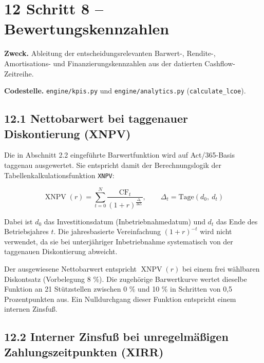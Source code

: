 \documentclass[
  a4paper,
  10pt]{article}
\begin{document}
\hypertarget{schritt-8-bewertungskennzahlen}{%
\section{12 Schritt 8 --
Bewertungskennzahlen}\label{schritt-8-bewertungskennzahlen}}

\textbf{Zweck.} Ableitung der entscheidungsrelevanten Barwert-,
Rendite-, Amortisations- und Finanzierungskennzahlen aus der datierten
Cashflow-Zeitreihe.

\textbf{Codestelle.} \nolinkurl{engine/kpis.py} und
\nolinkurl{engine/analytics.py} (\texttt{calculate\_lcoe}).

\hypertarget{nettobarwert-bei-taggenauer-diskontierung-xnpv}{%
\subsection{12.1 Nettobarwert bei taggenauer Diskontierung
(XNPV)}\label{nettobarwert-bei-taggenauer-diskontierung-xnpv}}

Die in Abschnitt 2.2 eingeführte Barwertfunktion wird auf Act/365-Basis
taggenau ausgewertet. Sie entspricht damit der Berechnungslogik der
Tabellenkalkulationsfunktion \texttt{XNPV}:

\[ \operatorname{XNPV}(r) = \sum_{t=0}^{N} \frac{\mathrm{CF}_t}{(1+r)^{\frac{\Delta_t}{365}}}, \qquad \Delta_t = \text{Tage}(d_0,\ d_t) \]

Dabei ist \(d_0\) das Investitionsdatum (Inbetriebnahmedatum) und
\(d_t\) das Ende des Betriebsjahres \(t\). Die jahresbasierte
Vereinfachung \((1+r)^{-t}\) wird nicht verwendet, da sie bei
unterjähriger Inbetriebnahme systematisch von der taggenauen
Diskontierung abweicht.

Der ausgewiesene Nettobarwert entspricht \(\operatorname{XNPV}(r)\) bei
einem frei wählbaren Diskontsatz (Vorbelegung 8 \%). Die zugehörige
Barwertkurve wertet dieselbe Funktion an 21 Stützstellen zwischen 0 \%
und 10 \% in Schritten von 0,5 Prozentpunkten aus. Ein Nulldurchgang
dieser Funktion entspricht einem internen Zinsfuß.

\hypertarget{interner-zinsfuuxdf-bei-unregelmuxe4uxdfigen-zahlungszeitpunkten-xirr}{%
\subsection{12.2 Interner Zinsfuß bei unregelmäßigen Zahlungszeitpunkten
(XIRR)}\label{interner-zinsfuuxdf-bei-unregelmuxe4uxdfigen-zahlungszeitpunkten-xirr}}
\end{document}
